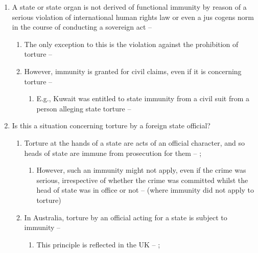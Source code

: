 \begin{enumerate}
    \begin{enumerate}
        \item A state or state organ is not derived of functional immunity by reason of a serious violation of international human rights law or even a \gls{jus cogens} norm in the course of conducting a sovereign act -- 
        \begin{enumerate}
            \item The only exception to this is the violation against the prohibition of torture -- 
            \item However, immunity is granted for civil claims, even if it is concerning torture -- 
            \begin{enumerate}
                \item E.g., Kuwait was entitled to state immunity from a civil suit from a person alleging state torture -- 
            \end{enumerate}
        \end{enumerate}
    \item Is this a situation concerning torture by a foreign state official?
    \begin{enumerate}
        \item Torture at the hands of a state are acts of an official character, and so heads of state are immune from prosecution for them -- ; 
        \begin{enumerate}
            \item However, such an immunity might not apply, even if the crime was serious, irrespective of whether the crime was committed whilst the head of state was in office or not --  (where immunity did not apply to torture)
        \end{enumerate}
        \item In Australia, torture by an official acting for a state is subject to immunity -- 
        \begin{enumerate}
            \item This principle is reflected in the UK -- ; 
        \end{enumerate}
    \end{enumerate}
    \end{enumerate}
\end{enumerate}


